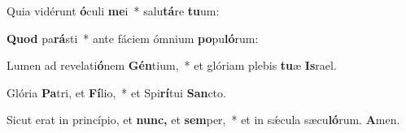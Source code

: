 \item Quia vidérunt \textbf{ó}culi \textbf{me}i~* salu\textbf{tá}re \textbf{tu}um:
\item \textbf{Quod} pa\textbf{rá}sti~* ante fáciem ómnium \textbf{po}pu\textbf{ló}rum:
\item Lumen ad revelati\textbf{ó}nem \textbf{Gén}tium,~* et glóriam plebis \textbf{tu}æ \textbf{Is}rael.
\item Glória \textbf{Pa}tri, et \textbf{Fí}lio,~* et Spi\textbf{rí}tui \textbf{San}cto.
\item Sicut erat in princípio, et \textbf{nunc,} et \textbf{sem}per,~* et in sǽcula sæcu\textbf{ló}rum. \textbf{A}men.